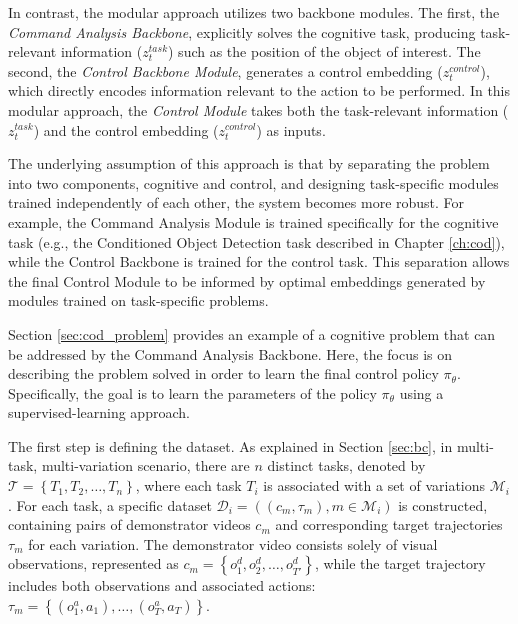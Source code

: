 In contrast, the modular approach utilizes two backbone modules. The first, the \textit{Command Analysis Backbone}, explicitly solves the cognitive task, producing task-relevant information ($z^{task}_t$) such as the position of the object of interest. The second, the \textit{Control Backbone Module}, generates a control embedding ($z^{control}_t$), which directly encodes information relevant to the action to be performed. In this modular approach, the \textit{Control Module} takes both the task-relevant information ($z^{task}_t$) and the control embedding ($z^{control}_t$) as inputs.



The underlying assumption of this approach is that by separating the problem into two components, cognitive and control, and designing task-specific modules trained independently of each other, the system becomes more robust. For example, the Command Analysis Module is trained specifically for the cognitive task (e.g., the Conditioned Object Detection task described in Chapter \ref{ch:cod}), while the Control Backbone is trained for the control task. This separation allows the final Control Module to be informed by optimal embeddings generated by modules trained on task-specific problems.

Section \ref{sec:cod_problem} provides an example of a cognitive problem that can be addressed by the Command Analysis Backbone. Here, the focus is on describing the problem solved in order to learn the final control policy $\pi_{\theta}$. Specifically, the goal is to learn the parameters of the policy $\pi_{\theta}$ using a supervised-learning approach.

The first step is defining the dataset. As explained in Section \ref{sec:bc}, in multi-task, multi-variation scenario, there are $n$ distinct tasks, denoted by $\mathcal{T} = \left\{T_{1}, T_{2}, \dots, T_{n}\right\}$, where each task $T_{i}$ is associated with a set of variations $\mathcal{M}_{i}$. For each task, a specific dataset $\mathcal{D}_{i} = ((c_{m}, \tau_{m}), m \in \mathcal{M}_{i})$ is constructed, containing pairs of demonstrator videos $c_{m}$ and corresponding target trajectories $\tau_{m}$ for each variation. The demonstrator video consists solely of visual observations, represented as $c_{m} = \left\{o^{d}_{1}, o^{d}_{2}, \dots, o^{d}_{T'}\right\}$, while the target trajectory includes both observations and associated actions: $\tau_{m} = \left\{(o^{a}_{1},a_{1}), \dots, (o^{a}_{T}, a_{T})\right\}$.

